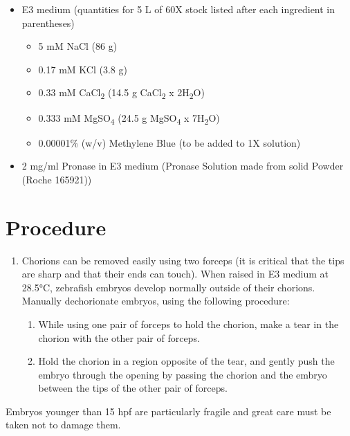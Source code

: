 \documentclass[
  letterpaper,
  DIV=11,
  numbers=noendperiod]{scrreprt}
\providecommand{\tightlist}{%
  \setlength{\itemsep}{0pt}\setlength{\parskip}{0pt}}\usepackage{longtable,booktabs,array}
\begin{document}
\begin{itemize}
\tightlist
\item
  E3 medium (quantities for 5 L of 60X stock listed after each
  ingredient in parentheses)

  \begin{itemize}
  \tightlist
  \item
    5 mM NaCl (86 g)
  \item
    0.17 mM KCl (3.8 g)
  \item
    0.33 mM CaCl\textsubscript{2} (14.5 g CaCl\textsubscript{2} x
    2H\textsubscript{2}O)
  \item
    0.333 mM MgSO\textsubscript{4} (24.5 g MgSO\textsubscript{4} x
    7H\textsubscript{2}O)
  \item
    0.00001\% (w/v) Methylene Blue (to be added to 1X solution)
  \end{itemize}
\item
  2 mg/ml Pronase in E3 medium (Pronase Solution made from solid Powder
  (Roche 165921))
\end{itemize}

\hypertarget{procedure-63}{%
\section{Procedure}\label{procedure-63}}

\begin{enumerate}
\def\labelenumi{\arabic{enumi}.}
\item
  Chorions can be removed easily using two forceps (it is critical that
  the tips are sharp and that their ends can touch). When raised in E3
  medium at 28.5°C, zebrafish embryos develop normally outside of their
  chorions. Manually dechorionate embryos, using the following
  procedure:

  \begin{enumerate}
  \def\labelenumii{\alph{enumii}.}
  \tightlist
  \item
    While using one pair of forceps to hold the chorion, make a tear in
    the chorion with the other pair of forceps.
  \item
    Hold the chorion in a region opposite of the tear, and gently push
    the embryo through the opening by passing the chorion and the embryo
    between the tips of the other pair of forceps.
  \end{enumerate}
\end{enumerate}

\begin{tcolorbox}[enhanced jigsaw, rightrule=.15mm, title=\textcolor{quarto-callout-warning-color}{\faExclamationTriangle}\hspace{0.5em}{IMPORTANT}, titlerule=0mm, opacitybacktitle=0.6, toprule=.15mm, bottomrule=.15mm, opacityback=0, left=2mm, colframe=quarto-callout-warning-color-frame, breakable, coltitle=black, colback=white, colbacktitle=quarto-callout-warning-color!10!white, bottomtitle=1mm, leftrule=.75mm, toptitle=1mm, arc=.35mm]

Embryos younger than 15 hpf are particularly fragile and great care must
be taken not to damage them.

\end{tcolorbox}
\end{document}
